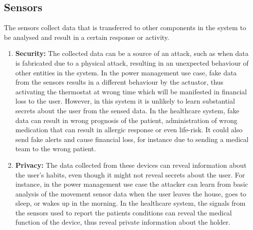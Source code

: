 \documentclass{llncs}
\begin{document}
\subsection{Sensors}
The sensors collect data that is transferred to other components in the system to be analysed and result in a certain response or activity. 
\begin{enumerate}
\item \textbf{Security:}
 The collected data can be a source of an attack\cite{Eschenauer2002}, such as when data is fabricated due to a physical attack, resulting in an unexpected behaviour of other entities in the system. In the power management use case, fake data from the sensors results in a different behaviour by the actuator, thus activating the thermostat at wrong time which will be manifested in financial loss to the user. However, in this system it is unlikely to learn substantial secrets about the user from the sensed data. In the healthcare system, fake data can result in wrong prognosis of the patient, administration of wrong medication that can result in allergic response or even life-risk\cite{Parmar2012,Alexander2013}. It could also send fake alerts and cause financial loss, for instance due to sending a medical team to the wrong patient.

\item \textbf{Privacy:} 
The data collected from these devices can reveal information about the user's habits, even though it might not reveal secrets about the user. For instance, in the power management use case the attacker can learn from basic analysis of the movement sensor data when the user leaves the house, goes to sleep, or wakes up in the morning. In the healthcare system, the signals from the sensors used to report the patients conditions can reveal the medical function of the device, thus reveal private information about the holder. 
\end{enumerate}
\end{document}
